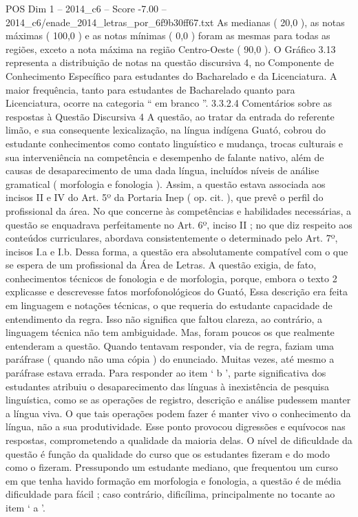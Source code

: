 \begin{textsample}{POS Dim 1 – 2014\_c6 – Score -7.00 – 2014\_c6/enade\_2014\_letras\_por\_6f9b30ff67.txt}
As medianas ( 20,0 ), as notas máximas ( 100,0 ) e as notas mínimas ( 0,0 ) foram as mesmas para todas as regiões, exceto a nota máxima na região Centro-Oeste ( 90,0 ).
O Gráfico 3.13 representa a distribuição de notas na questão discursiva 4, no Componente de Conhecimento Específico para estudantes do Bacharelado e da Licenciatura.
A maior frequência, tanto para estudantes de Bacharelado quanto para Licenciatura, ocorre na categoria “ em branco ”. 3.3.2.4 Comentários sobre as respostas à Questão Discursiva 4 A questão, ao tratar da entrada do referente limão, e sua consequente lexicalização, na língua indígena Guató, cobrou do estudante conhecimentos como contato linguístico e mudança, trocas culturais e sua interveniência na competência e desempenho de falante nativo, além de causas de desaparecimento de uma dada língua, incluídos níveis de análise gramatical ( morfologia e fonologia ).
Assim, a questão estava associada aos incisos II e IV do Art. 5º da Portaria Inep ( op. cit. ), que prevê o perfil do profissional da área.
No que concerne às competências e habilidades necessárias, a questão se enquadrava perfeitamente no Art. 6º, inciso II ; no que diz respeito aos conteúdos curriculares, abordava consistentemente o determinado pelo Art. 7º, incisos I.a e I.b.
Dessa forma, a questão era absolutamente compatível com o que se espera de um profissional da Área de Letras.
A questão exigia, de fato, conhecimentos técnicos de fonologia e de morfologia, porque, embora o texto 2 explicasse e descrevesse fatos morfofonológicos do Guató, Essa descrição era feita em linguagem e notações técnicas, o que requeria do estudante capacidade de entendimento da regra.
Isso não significa que faltou clareza, ao contrário, a linguagem técnica não tem ambiguidade.
Mas, foram poucos os que realmente entenderam a questão.
Quando tentavam responder, via de regra, faziam uma paráfrase ( quando não uma cópia ) do enunciado.
Muitas vezes, até mesmo a paráfrase estava errada.
Para responder ao item ‘ b ’, parte significativa dos estudantes atribuiu o desaparecimento das línguas à inexistência de pesquisa linguística, como se as operações de registro, descrição e análise pudessem manter a língua viva.
O que tais operações podem fazer é manter vivo o conhecimento da língua, não a sua produtividade.
Esse ponto provocou digressões e equívocos nas respostas, comprometendo a qualidade da maioria delas.
O nível de dificuldade da questão é função da qualidade do curso que os estudantes fizeram e do modo como o fizeram.
Pressupondo um estudante mediano, que frequentou um curso em que tenha havido formação em morfologia e fonologia, a questão é de média dificuldade para fácil ; caso contrário, dificílima, principalmente no tocante ao item ‘ a ’.

\end{textsample}
